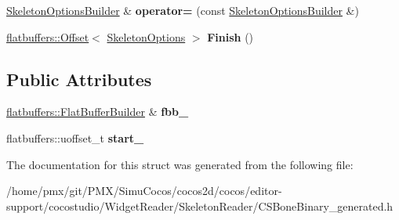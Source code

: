\begin{DoxyCompactItemize}
\item 
\mbox{\label{structflatbuffers_1_1SkeletonOptionsBuilder_a108bda6f6857114c5686392b52740693}} 
\hyperlink{structflatbuffers_1_1SkeletonOptionsBuilder}{Skeleton\+Options\+Builder} \& {\bfseries operator=} (const \hyperlink{structflatbuffers_1_1SkeletonOptionsBuilder}{Skeleton\+Options\+Builder} \&)
\item 
\mbox{\label{structflatbuffers_1_1SkeletonOptionsBuilder_a5924f621a5c7e9642285ab0d90fcb9bd}} 
\hyperlink{structflatbuffers_1_1Offset}{flatbuffers\+::\+Offset}$<$ \hyperlink{structflatbuffers_1_1SkeletonOptions}{Skeleton\+Options} $>$ {\bfseries Finish} ()
\end{DoxyCompactItemize}
\subsection*{Public Attributes}
\begin{DoxyCompactItemize}
\item 
\mbox{\label{structflatbuffers_1_1SkeletonOptionsBuilder_aa463c31e4566132843c86d0e48d6281d}} 
\hyperlink{classflatbuffers_1_1FlatBufferBuilder}{flatbuffers\+::\+Flat\+Buffer\+Builder} \& {\bfseries fbb\+\_\+}
\item 
\mbox{\label{structflatbuffers_1_1SkeletonOptionsBuilder_a047c65c9d69f14715bf5bcfcb9cf3f99}} 
flatbuffers\+::uoffset\+\_\+t {\bfseries start\+\_\+}
\end{DoxyCompactItemize}


The documentation for this struct was generated from the following file\+:\begin{DoxyCompactItemize}
\item 
/home/pmx/git/\+P\+M\+X/\+Simu\+Cocos/cocos2d/cocos/editor-\/support/cocostudio/\+Widget\+Reader/\+Skeleton\+Reader/C\+S\+Bone\+Binary\+\_\+generated.\+h\end{DoxyCompactItemize}
